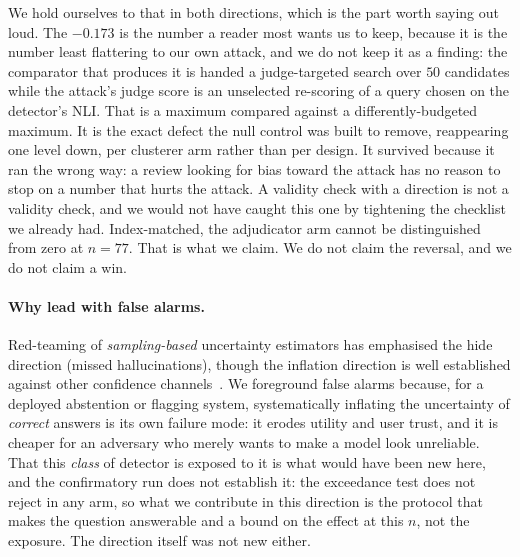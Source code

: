 We hold ourselves to that in both directions, which is the part worth saying out loud. The
$-0.173$ is the number a reader most wants us to keep, because it is the number least
flattering to our own attack, and we do not keep it as a finding: the comparator that
produces it is handed a judge-targeted search over $50$ candidates while the attack's judge
score is an unselected re-scoring of a query chosen on the detector's NLI. That is a maximum
compared against a differently-budgeted maximum. It is the exact defect the null control was
built to remove, reappearing one level down, per clusterer arm rather than per design. It
survived because it ran the wrong way: a review looking for bias toward the attack has no
reason to stop on a number that hurts the attack. A validity check with a direction is not a
validity check, and we would not have caught this one by tightening the checklist we already
had. Index-matched, the adjudicator arm cannot be distinguished from zero at $n{=}77$. That
is what we claim. We do not claim the reversal, and we do not claim a win.

\paragraph{Why lead with false alarms.}
Red-teaming of \emph{sampling-based} uncertainty estimators has emphasised the hide
direction (missed hallucinations), though the inflation direction is well established
against other confidence channels~\citep{rusert2025redherring,
khanmohammadi2026answerpreserving}. We foreground false alarms because, for a deployed abstention or
flagging system, systematically inflating the uncertainty of \emph{correct} answers
is its own failure mode: it erodes utility and user trust, and it is cheaper for an
adversary who merely wants to make a model look unreliable. That this \emph{class} of
detector is exposed to it is what would have been new here, and the confirmatory run does not
establish it: the exceedance test does not reject in any arm, so what we contribute in this
direction is the protocol that makes the question answerable and a bound on the effect at this
$n$, not the exposure. The direction itself was not new either.

